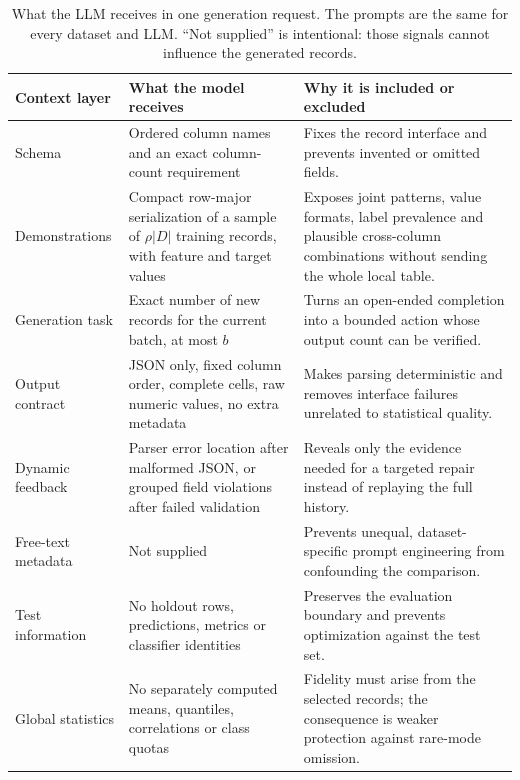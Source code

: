 \documentclass[conference]{IEEEtran}
\begin{document}
\begin{table}[t]
\centering
\caption{What the LLM receives in one generation request. The prompts are the same for every dataset and LLM. ``Not supplied'' is intentional: those signals cannot influence the generated records.}
\label{tab:prompt-context}
\footnotesize
\begin{tabular}{p{}p{}p{}}
\toprule
Context layer & What the model receives & Why it is included or excluded \\
\midrule
Schema & Ordered column names and an exact column-count requirement & Fixes the record interface and prevents invented or omitted fields. \\
Demonstrations & Compact row-major serialization of a sample of $\rho|D|$ training records, with feature and target values & Exposes joint patterns, value formats, label prevalence and plausible cross-column combinations without sending the whole local table. \\
Generation task & Exact number of new records for the current batch, at most $b$ & Turns an open-ended completion into a bounded action whose output count can be verified. \\
Output contract & JSON only, fixed column order, complete cells, raw numeric values, no extra metadata & Makes parsing deterministic and removes interface failures unrelated to statistical quality. \\
Dynamic feedback & Parser error location after malformed JSON, or grouped field violations after failed validation & Reveals only the evidence needed for a targeted repair instead of replaying the full history. \\
Free-text metadata & Not supplied & Prevents unequal, dataset-specific prompt engineering from confounding the comparison. \\
Test information & No holdout rows, predictions, metrics or classifier identities & Preserves the evaluation boundary and prevents optimization against the test set. \\
Global statistics & No separately computed means, quantiles, correlations or class quotas & Fidelity must arise from the selected records; the consequence is weaker protection against rare-mode omission. \\
\bottomrule
\end{tabular}
\end{table}
\end{document}
